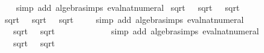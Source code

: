\begin{isabellebody}
\ \ %
\endisadelimproof
%
\isatagproof
{}\isamarkupfalse%
\ {\isacharparenleft}{\kern0pt}simp\ add{\isacharcolon}{\kern0pt}\ algebra{\isacharunderscore}{\kern0pt}simps\ eval{\isacharunderscore}{\kern0pt}nat{\isacharunderscore}{\kern0pt}numeral{\isacharparenright}{\kern0pt}%
\endisatagproof
{\isafoldproof}%
%
\isadelimproof
\isanewline
%
\endisadelimproof
\isanewline
{}\isamarkupfalse%
\ {\isachardoublequoteopen}sqrt\ {}\ {\isacharplus}{\kern0pt}\ sqrt\ {}\ {\isacharless}{\kern0pt}\ sqrt\ {}{}{\isachardoublequoteclose}\isanewline
%
\isadelimproof
%
\endisadelimproof
%
\isatagproof
{}\isamarkupfalse%
\ {\isacharminus}{\kern0pt}\isanewline
\ \ \isamarkupfalse%
\ {\isachardoublequoteopen}{\isacharparenleft}{\kern0pt}sqrt\ {}\ {\isacharplus}{\kern0pt}\ sqrt\ {}{\isacharparenright}{\kern0pt}{\isacharcircum}{\kern0pt}{}\ {\isacharless}{\kern0pt}\ {\isacharparenleft}{\kern0pt}sqrt\ {}{}{\isacharparenright}{\kern0pt}{\isacharcircum}{\kern0pt}{}{\isachardoublequoteclose}\isanewline
\ \ \isamarkupfalse%
\ {\isacharparenleft}{\kern0pt}simp\ add{\isacharcolon}{\kern0pt}\ algebra{\isacharunderscore}{\kern0pt}simps\ eval{\isacharunderscore}{\kern0pt}nat{\isacharunderscore}{\kern0pt}numeral{\isacharparenright}{\kern0pt}\isanewline
\ \ \ \ \isamarkupfalse%
\ {\isachardoublequoteopen}{\isacharparenleft}{\kern0pt}{}\ {\isacharasterisk}{\kern0pt}\ {\isacharparenleft}{\kern0pt}sqrt\ {}\ {\isacharasterisk}{\kern0pt}\ sqrt\ {}{\isacharparenright}{\kern0pt}{\isacharparenright}{\kern0pt}{\isacharcircum}{\kern0pt}{}\ {\isacharless}{\kern0pt}\ {}\ {\isacharcircum}{\kern0pt}\ {}{\isachardoublequoteclose}\isanewline
\ \ \ \ \ \ \isamarkupfalse%
\ {\isacharparenleft}{\kern0pt}simp\ add{\isacharcolon}{\kern0pt}\ algebra{\isacharunderscore}{\kern0pt}simps\ eval{\isacharunderscore}{\kern0pt}nat{\isacharunderscore}{\kern0pt}numeral{\isacharparenright}{\kern0pt}\isanewline
\ \ \ \ \isamarkupfalse%
\ \isamarkupfalse%
\ {\isachardoublequoteopen}{}\ {\isacharasterisk}{\kern0pt}\ {\isacharparenleft}{\kern0pt}sqrt\ {}\ {\isacharasterisk}{\kern0pt}\ sqrt\ {}{\isacharparenright}{\kern0pt}\ {\isacharless}{\kern0pt}\ {}{\isachardoublequoteclose}\isanewline
\ \ \ \ \ \ \isamarkupfalse%

\end{isabellebody}
